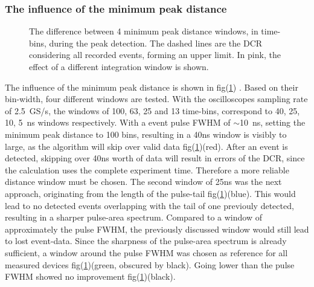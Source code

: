 \documentclass[12pt,article,type=msc,colorback,accentcolor=tud9c]{tudthesis}
\begin{document}
\subsubsection{The influence of the minimum peak distance}
\label{subsec:subsec_mpd}
\begin{figure}[h]
\begin{centering}
\caption[MPD parameter challenges and the integration window]{The difference between 4 minimum peak distance windows, in time-bins, during the peak detection. The dashed lines are the DCR considering all recorded events, forming an upper limit. In pink, the effect of a different integration window is shown.}
\label{fig:MPD_plot}
\end{centering}
\end{figure}
The influence of the minimum peak distance is shown in fig(\ref{fig:MPD_plot}) . Based on their bin-width, four different windows are tested. With the oscilloscopes sampling rate of 2.5~GS/s, the windows of 100, 63, 25 and 13 time-bins, correspond to 40, 25, 10, 5~ns windows respectively. With a event pulse FWHM of $\sim$10~ns, setting the minimum peak distance to 100 bins, resulting in a 40ns window is visibly to large, as the algorithm will skip over valid data fig(\ref{fig:MPD_plot})(red). After an event is detected, skipping over 40ns worth of data will result in errors of the DCR, since the calculation uses the complete experiment time. Therefore a more reliable distance window must be chosen. The second window of 25ns was the next approach, originating from the length of the pulse-tail fig(\ref{fig:MPD_plot})(blue). This would lead to no detected events overlapping with the tail of one previouly detected, resulting in a sharper pulse-area spectrum. Compared to a window of approximately the pulse FWHM, the previously discussed window would still lead to lost event-data. Since the sharpness of the pulse-area spectrum is already sufficient, a window around the pulse FWHM was chosen as reference for all measured devices fig(\ref{fig:MPD_plot})(green, obscured by black). Going lower than the pulse FWHM showed no improvement fig(\ref{fig:MPD_plot})(black). 
\end{document}
